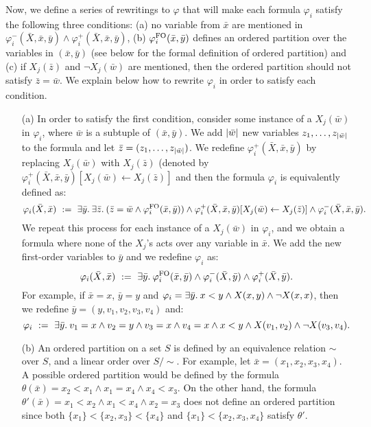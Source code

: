 Now, we define a series of rewritings to $\varphi$ that will make each formula $\varphi_i$ satisfy the following three conditions: (a) no variable from $\bar{x}$ are mentioned in $\varphi_i^{-}(\bar{X},\bar{x},\bar{y})\wedge\varphi_i^{+}(\bar{X},\bar{x},\bar{y})$, (b) $\varphi_i^{{\rm FO}}(\bar{x},\bar{y})$ defines an ordered partition over the variables in $(\bar{x},\bar{y})$ (see below for the formal definition of ordered partition) and (c) if $X_j(\bar{z})$ and $\neg X_j(\bar{w})$ are mentioned, then the ordered partition should not satisfy $\bar{z} = \bar{w}$.
We explain below how to rewrite $\varphi_i$ in order to satisfy each condition.
\begin{itemize} \itemsep1mm
	\item[(a)] In order to satisfy the first condition, consider some instance of a $X_j(\bar{w})$ in $\varphi_i$, where $\bar{w}$ is a subtuple of $(\bar{x},\bar{y})$. We add $\vert \bar{w} \vert$ new variables $z_1,\ldots,z_{\vert \bar{w} \vert}$ to the formula and let $\bar{z} = (z_1,\ldots,z_{\vert \bar{w} \vert})$. We redefine $\varphi_i^{+}(\bar{X},\bar{x},\bar{y})$ by replacing $X_j(\bar{w})$ with $X_j(\bar{z})$ (denoted by $\varphi_i^{+}(\bar{X},\bar{x},\bar{y})[X_j(\bar{w}) \leftarrow X_j(\bar{z})]$ and then the formula $\varphi_i$ is equivalently defined as:
	$$
	\varphi_i(\bar{X},\bar{x}) \ := \ \exists{\bar{y}}.\: \exists{\bar{z}}.\: (\bar{z} = \bar{w} \wedge \varphi_i^{{\rm FO}}(\bar{x},\bar{y})) \wedge \varphi_i^{+}(\bar{X},\bar{x},\bar{y})[X_j(\bar{w}) \leftarrow X_j(\bar{z})] \wedge
	\varphi_i^{-}(\bar{X},\bar{x},\bar{y}).
	$$
	We repeat this process for each instance of a $X_j(\bar{w})$ in $\varphi_i$, and we obtain a formula where none of the $X_j$'s acts over any variable in $\bar{x}$. We add the new first-order variables to $\bar{y}$ and we redefine $\varphi_i$ as:
	$$
	\varphi_i(\bar{X},\bar{x}) \ := \  \exists{\bar{y}}.\: \varphi_i^{{\rm FO}}(\bar{x},\bar{y}) \wedge \varphi_i^{-}(\bar{X},\bar{y}) \wedge \varphi_i^{+}(\bar{X},\bar{y}).
	$$
	For example, if $\bar{x} = x$, $\bar{y} = y$ and $\varphi_i = \exists{\bar{y}}.\:  x < y \wedge  X(x,y)\wedge \neg X(x,x)$, then we redefine $\bar{y} = (y,v_1,v_2,v_3,v_4)$ and:
	$$
	\varphi_i \ := \ \exists{\bar{y}}.\: v_1 = x \wedge v_2 = y \wedge v_3 = x \wedge v_4 = x \wedge x < y  \wedge  X(v_1,v_2) \wedge \neg X(v_3,v_4).
	$$ 
	\item[(b)] An ordered partition on a set $S$ is defined by an equivalence relation $\sim$ over $S$, and a linear order over $S/\!\sim$. For example, let $\bar{x} = (x_1,x_2,x_3,x_4)$. A possible ordered partition would be defined by the formula $\theta(\bar{x}) = x_2 < x_1 \wedge x_1 = x_4 \wedge x_4 < x_3$. On the other hand, the formula $\theta'(\bar{x}) = x_1 < x_2 \wedge x_1 < x_4 \wedge x_2 = x_3$ does not define an ordered partition since both $\{x_1\}<\{x_2,x_3\}<\{x_4\}$ and $\{x_1\} < \{x_2,x_3,x_4\}$ satisfy $\theta'$.

\end{itemize}
